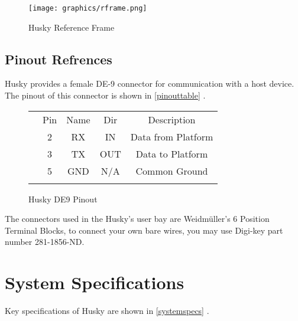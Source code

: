 \documentclass[]{clearpath-latex/clearpath-manual}
\begin{document}
 \begin{figure}[h]
	\texttt{[image: graphics/rframe.png]}
	\caption{Husky Reference Frame}
	\label{rframe}
 \end{figure}

\subsection{Pinout Refrences}

Husky provides a female DE-9 connector for communication with a host device. The pinout of this connector is shown in \autoref{pinouttable} .


\begin{figure}[h]
	\centering
	\begin{tabular}{  >{\centering\arraybackslash}m{.4\linewidth} c c c c }
	\multirow{5}{*}{\texttt{[image: graphics/pinout.png]}} \\  \cline{2-5}
	& \cellcolor{lightgrey}  Pin & \cellcolor{lightgrey}  Name & \cellcolor{lightgrey}  Dir & \cellcolor{lightgrey}  Description \\ \cline{2-5}
	& 2 & RX & IN & Data from Platform\\  \cline{2-5}
	& 3 & TX & OUT & Data to Platform\\ \cline{2-5}
	& 5 & GND & N/A & Common Ground\\ \cline{2-5}
	\end{tabular}
	\newline
	\caption{Husky DE9 Pinout}
	\label{pinouttable}

\end{figure}

The connectors used in the Husky's user bay  are Weidmüller's 6 Position Terminal Blocks, to connect your own bare wires, you may use Digi-key part number 281-1856-ND.

\newpage

\section{System Specifications}

Key specifications of Husky are shown in \autoref{systemspecs} .
\end{document}
